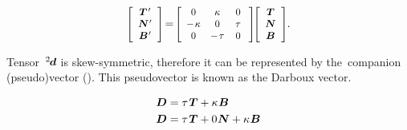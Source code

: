 \begin{otherlanguage}{russian}
\nopagebreak\begin{equation*}
\scalebox{.88}{$ \left[ \hspace{.1ex}
\begin{array}{c}
\bm{T}{\hspace{.25ex}'}\\
\bm{N}{\hspace{.1ex}'}\\
\bm{B}{\hspace{.15ex}'}
\end{array} \hspace{.1ex} \right] $}
\hspace{-0.4ex} = \hspace{-0.4ex}
\scalebox{.88}{$ \left[ \begin{array}{ccc}
0 & \kappa & 0 \\
-\hspace{.2ex} \kappa & 0 & \hspace{.3ex} \tau \hspace{.3ex} \\
0 & -\hspace{.2ex} \tau & 0
\end{array} \hspace{.4ex} \right] $}
\hspace{-0.4ex}
\scalebox{.88}{$ \left[ \hspace{.1ex}
\begin{array}{c}
\bm{T} \\
\bm{N} \\
\bm{B}
\end{array} \hspace{.1ex} \right] $}
\hspace{-0.1ex} .
\end{equation*}

Tensor~${^2\hspace{-0.2ex}\bm{d}}$ is skew-symmetric, therefore it can be represented by the~companion (pseudo)vector ().
This pseudovector is known as the Darboux vector.

\begin{align*}
\bm{D} &= \tau \hspace{.2ex} \bm{T} + \kappa \hspace{.1ex} \bm{B}
\\
\bm{D} &= \tau \hspace{.2ex} \bm{T} + 0 \hspace{.1ex} \bm{N} + \kappa \hspace{.1ex} \bm{B}
\end{align*}


\end{otherlanguage}
